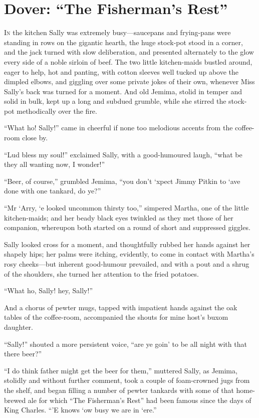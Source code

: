 
\chapter{Dover: \enquote{The Fisherman's Rest}}
\lettrine[lines=4]{I}{n} the kitchen Sally was extremely busy---sauce\-pans and frying-pans were standing in rows on the gigantic hearth, the huge stock-pot stood in a corner, and the jack turned with slow deliberation, and presented alternately to the glow every side of a noble sirloin of beef. The two little kitchen-maids bustled around, eager to help, hot and panting, with cotton sleeves well tucked up above the dimpled elbows, and giggling over some private jokes of their own, whenever Miss Sally's back was turned for a moment. And old Jemima, stolid in temper and solid in bulk, kept up a long and subdued grumble, while she stirred the stock-pot methodically over the fire.

\enquote{What ho! Sally!} came in cheerful if none too melodious accents from the coffee-room close by.

\enquote{Lud bless my soul!} exclaimed Sally, with a good-humoured laugh, \enquote{what be they all wanting now, I wonder!}

\enquote{Beer, of course,} grumbled Jemima, \enquote{you don't `xpect Jimmy Pitkin to `ave done with one tankard, do ye?}

\enquote{Mr `Arry, `e looked uncommon thirsty too,} simpered Martha, one of the little kitchen-maids; and her beady black eyes twinkled as they met those of her companion, whereupon both started on a round of short and suppressed giggles.

Sally looked cross for a moment, and thoughtfully rubbed her hands against her shapely hips; her palms were itching, evidently, to come in contact with Martha's rosy cheeks---but inherent good-humour prevailed, and with a pout and a shrug of the shoulders, she turned her attention to the fried potatoes.

\enquote{What ho, Sally! hey, Sally!}

And a chorus of pewter mugs, tapped with impatient hands against the oak tables of the coffee-room, accompanied the shouts for mine host's buxom daughter.

\enquote{Sally!} shouted a more persistent voice, \enquote{are ye goin’ to be all night with that there beer?}

\enquote{I do think father might get the beer for them,} muttered Sally, as Jemima, stolidly and without further comment, took a couple of foam-crowned jugs from the shelf, and began filling a number of pewter tankards with some of that home-brewed ale for which \enquote{The Fisherman's Rest} had been famous since the days of King Charles. \enquote{’E knows `ow busy we are in `ere.}

